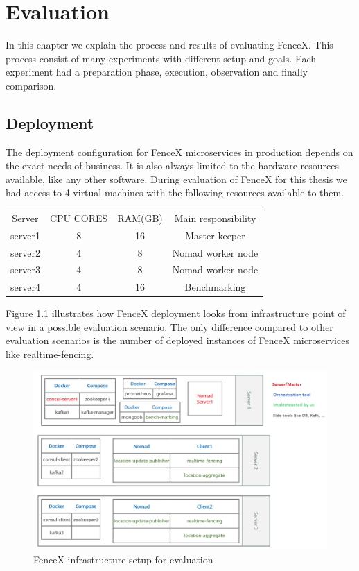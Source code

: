 \documentclass[a4]{report}
\begin{document}
    \chapter{Evaluation}
    In this chapter we explain the process and results of evaluating FenceX.
    This process consist of many experiments with different setup and goals.
    Each experiment had a preparation phase, execution, observation and finally comparison.

    \section{Deployment}
    The deployment configuration for FenceX microservices in production depends on the exact needs of business.
    It is also always limited to the hardware resources available, like any other software.
    During evaluation of FenceX for this thesis we had access to 4 virtual machines with the following resources
    available to them.
    \begin{center}
        \begin{tabular}{ c c c c}
            Server  & CPU CORES & RAM(GB) & Main responsibility \\
            server1 & 8         & 16      & Master keeper       \\
            server2 & 4         & 8       & Nomad worker node   \\
            server3 & 4         & 8       & Nomad worker node   \\
            server4 & 4         & 16      & Benchmarking        \\
        \end{tabular}
    \end{center}


    Figure \ref{fig:infrastructure} illustrates how FenceX deployment looks from infrastructure point of view in a
    possible evaluation scenario.
    The only difference compared to other evaluation scenarios is the number of deployed instances of FenceX
    microservices like realtime-fencing.

    \begin{figure}[ht]
        \caption{FenceX infrastructure setup for evaluation}
        \label{fig:infrastructure}
        \includegraphics[scale=0.6]{images/Infrsutracture.png}
    \end{figure}
\end{document}
